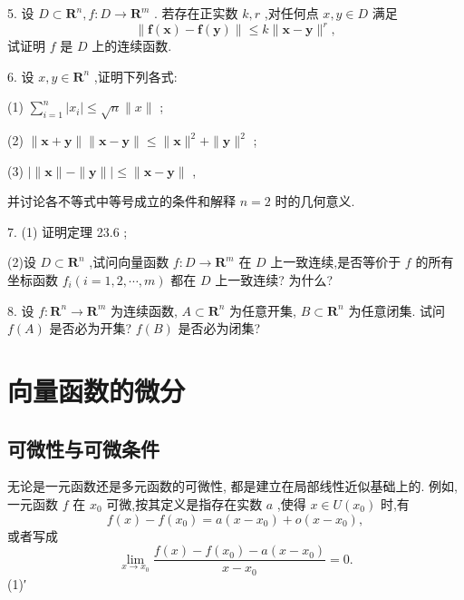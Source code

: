 \hspace*{1em} 5. 设 \(D \subset  {\mathbf{R}}^{n},f : D \rightarrow  {\mathbf{R}}^{m}\) . 若存在正实数 \(k,r\) ,对任何点 \(x,y \in  D\) 满足
\[
\parallel \mathbf{f}\left( \mathbf{x}\right)  - \mathbf{f}\left( \mathbf{y}\right) \parallel  \leq  k\parallel \mathbf{x} - \mathbf{y}{\parallel }^{r},
\]
试证明 \(f\) 是 \(D\) 上的连续函数.



6. 设 \(x,y \in  {\mathbf{R}}^{n}\) ,证明下列各式:

(1) \(\mathop{\sum }\limits_{{i = 1}}^{n}\left| {x}_{i}\right|  \leq  \sqrt{n}\parallel x\parallel\) ;

(2) \(\parallel \mathbf{x} + \mathbf{y}\parallel \parallel \mathbf{x} - \mathbf{y}\parallel  \leq  \parallel \mathbf{x}{\parallel }^{2} + \parallel \mathbf{y}{\parallel }^{2}\) ;

(3) \(\left| {\parallel \mathbf{x}\parallel  - \parallel \mathbf{y}\parallel }\right|  \leq  \parallel \mathbf{x} - \mathbf{y}\parallel\) ,

并讨论各不等式中等号成立的条件和解释 \(n = 2\) 时的几何意义.

7. (1) 证明定理 23.6 ;

(2)设 \(D \subset  {\mathbf{R}}^{n}\) ,试问向量函数 \(f : D \rightarrow  {\mathbf{R}}^{m}\) 在 \(D\) 上一致连续,是否等价于 \(f\) 的所有坐标函数 \({f}_{i}(i = 1 ,2,\cdots ,m)\) 都在 \(D\) 上一致连续? 为什么?

8. 设 \(f : {\mathbf{R}}^{n} \rightarrow  {\mathbf{R}}^{m}\) 为连续函数, \(A \subset  {\mathbf{R}}^{n}\) 为任意开集, \(B \subset  {\mathbf{R}}^{n}\) 为任意闭集. 试问 \(f\left( A\right)\) 是否必为开集? \(f\left( B\right)\) 是否必为闭集?

\section{向量函数的微分}

\subsection{可微性与可微条件}

无论是一元函数还是多元函数的可微性, 都是建立在局部线性近似基础上的. 例如,一元函数 \(f\) 在 \({x}_{0}\) 可微,按其定义是指存在实数 \(a\) ,使得 \(x \in  U\left( {x}_{0}\right)\) 时,有
\[
f\left( x\right)  - f\left( {x}_{0}\right)  = a\left( {x - {x}_{0}}\right)  + o\left( {x - {x}_{0}}\right) , \tag{1}
\]
或者写成
\[
\mathop{\lim }\limits_{{x \rightarrow  {x}_{0}}}\frac{f\left( x\right)  - f\left( {x}_{0}\right)  - a\left( {x - {x}_{0}}\right) }{x - {x}_{0}} = 0.
\]
 (1)′

